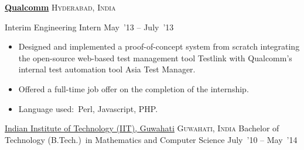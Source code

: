 \documentclass[10pt,a4paper]{article}
\begin{document}
\headedsection  %
  {\href{}{\textbf{Qualcomm}}}
  {\textsc{Hyderabad, India}}
  {%
  \headedsubsection
    {Interim Engineering Intern}
    {May~'13 -- July~'13}
    {\bodytext
    {
    \begin{itemize}
    \item Designed and implemented a proof-of-concept system from scratch integrating the open-source web-based test management tool Testlink with Qualcomm's internal test automation tool Asia Test Manager.
    \item Offered a full-time job offer on the completion of the internship.
    \item Language used:~Perl, Javascript, PHP.
    \end{itemize}}
    }
   
}

\spacedhrule{0.5em}{-0.4em}


\headedsection
  {\href{}{Indian Institute of Technology (IIT), Guwahati}}
  {\textsc{Guwahati, India}} {%
  \headedsubsection
    {Bachelor of Technology (B.Tech.)~in Mathematics and Computer Science}
    {July~'10 -- May~'14} {}
}


	

\spacedhrule{0.5em}{-0.4em}
\end{document}
